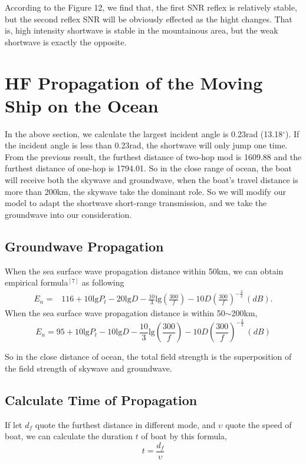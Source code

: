 \documentclass{mcmthesis}
\begin{document}
According to the Figure 12, we find that, the first SNR reflex is relatively stable, but the second reflex SNR will be obviously effected as the hight changes. That is, high intensity shortwave is stable in the mountainous area, but the weak shortwave is exactly the opposite. 

\section{HF Propagation of the Moving Ship on the Ocean }
In the above section, we calculate the largest incident angle is 0.23rad (13.18$^\circ$). If the incident angle is less than 0.23rad, the shortwave will only jump one time. From the previous result, the furthest distance of two-hop mod is 1609.88 and the furthest distance of one-hop is 1794.01. So in the close range of ocean, the boat will receive both the skywave and groundwave, when the boat's travel distance is more than 200km, the skywave take the dominant role. So we will modify our model to adapt the shortwave short-range transmission, and we take the groundwave into our consideration. 
\subsection{Groundwave Propagation}
When the sea surface wave propagation distance within 50km, we can obtain empirical formula$^{[7]}$ as following
\begin{align}
E_n = &116+10\mathrm{lg}P_t-20\mathrm{lg}D-\frac{10}{3}\mathrm{lg}\left( \frac{300}{f} \right)  -10D\left( \frac{300}{f} \right)^{-\frac{3}{2}} ~(dB).
\end{align}
When the sea surface wave propagation distance is within 50$\sim$200km, 
\begin{equation}
E_n = 95+10\mathrm{lg}P_t-10\mathrm{lg}D-\frac{10}{3}\mathrm{lg}\left(\frac{300}{f} \right)-10D\left( \frac{300}{f}\right)^{-\frac{3}{2}}~(dB)
\end{equation}

So in the close distance of ocean, the total field strength is the superposition of the field strength of skywave and groundwave.
\subsection{Calculate Time of Propagation}
 If let $d_f$ quote the furthest distance in different mode, and $\upsilon$ quote the speed of boat, we can calculate the duration $t$ of boat by this formula,
 \begin{equation}
	t = \frac{d_f}{\upsilon }
 \end{equation}
 
\end{document}

